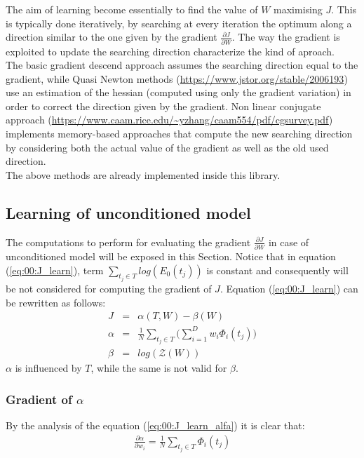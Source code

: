 The aim of learning become essentially to find the value of $W$ maximising $J$. This is typically done iteratively, by searching at every iteration the optimum along a direction similar
to the one given by the gradient $\frac{\partial J}{\partial W}$.
The way the gradient is exploited to update the searching direction characterize the kind of aproach.
\\
The basic gradient descend approach assumes the searching direction equal to the gradient, while Quasi Newton methods (\url{https://www.jstor.org/stable/2006193}) use an estimation of the hessian (computed using only the gradient variation) in order to
correct the direction given by the gradient. Non linear conjugate approach (\url{https://www.caam.rice.edu/~yzhang/caam554/pdf/cgsurvey.pdf}) implements memory-based approaches that compute the new searching direction by considering
both the actual value of the gradient as well as the old used direction.
\\
The above methods are already implemented inside this library.

\subsection{Learning of unconditioned model}
\label{sec:00:UNC_LEARN}
The computations to perform for evaluating the gradient $\frac{\partial J}{\partial W}$ in case of unconditioned model will be exposed in this Section.
Notice that in equation (\ref{eq:00:J_learn}), term $\sum _{t_j \in T}  log(E_0 (t_j))$ is constant and consequently will be not considered for computing the gradient of $J$. Equation (\ref{eq:00:J_learn}) can be rewritten as follows:
\begin{eqnarray}
J &=& \alpha (T, W) - \beta (W) \nonumber\\
\alpha &=& \frac{1}{N} \sum _{t_j \in T}  \big( \sum _{i=1} ^{D} w_i \Phi _i(t_j) \big) \label{eq:00:J_learn_alfa} \\
\beta &=& log(\mathcal{Z}(W)) \label{eq:00:J_learn_beta}
\end{eqnarray}
$\alpha$ is influenced by $T$, while the same is not valid for $\beta$. 

\subsubsection{Gradient of $\alpha$}

By the analysis of the equation (\ref{eq:00:J_learn_alfa}) it is clear that:
\begin{eqnarray}
\frac{\partial \alpha}{\partial w_i} = \frac{1}{N} \sum _{t_j \in T} \Phi _i(t_j)
\label{eq:00:J_learn_alpha_simplfied}
\end{eqnarray}

